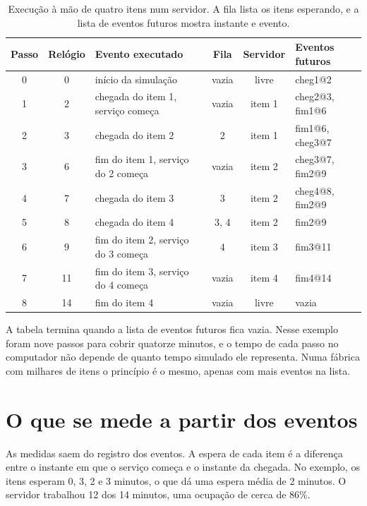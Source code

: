 \begin{table}[ht]
\centering
\caption{Execução à mão de quatro itens num servidor. A fila lista os itens esperando, e a lista de eventos futuros mostra instante e evento.}
\label{tab-eventos}
\small
\begin{tabular}{@{}cclccl@{}}
\toprule
\textbf{Passo} & \textbf{Relógio} & \textbf{Evento executado} & \textbf{Fila} & \textbf{Servidor} & \textbf{Eventos futuros} \\
\midrule
0 & 0  & início da simulação          & vazia & livre   & cheg1@2 \\
1 & 2  & chegada do item 1, serviço começa & vazia & item 1 & cheg2@3, fim1@6 \\
2 & 3  & chegada do item 2            & 2     & item 1  & fim1@6, cheg3@7 \\
3 & 6  & fim do item 1, serviço do 2 começa & vazia & item 2 & cheg3@7, fim2@9 \\
4 & 7  & chegada do item 3            & 3     & item 2  & cheg4@8, fim2@9 \\
5 & 8  & chegada do item 4            & 3, 4  & item 2  & fim2@9 \\
6 & 9  & fim do item 2, serviço do 3 começa & 4  & item 3  & fim3@11 \\
7 & 11 & fim do item 3, serviço do 4 começa & vazia & item 4 & fim4@14 \\
8 & 14 & fim do item 4                & vazia & livre   & vazia \\
\bottomrule
\end{tabular}
\end{table}

A tabela termina quando a lista de eventos futuros fica vazia. Nesse exemplo foram nove passos para cobrir quatorze minutos, e o tempo de cada passo no computador não depende de quanto tempo simulado ele representa. Numa fábrica com milhares de itens o princípio é o mesmo, apenas com mais eventos na lista.

\section{O que se mede a partir dos eventos}

As medidas saem do registro dos eventos. A espera de cada item é a diferença entre o instante em que o serviço começa e o instante da chegada. No exemplo, os itens esperam 0, 3, 2 e 3 minutos, o que dá uma espera média de 2 minutos. O servidor trabalhou 12 dos 14 minutos, uma ocupação de cerca de 86\%.

